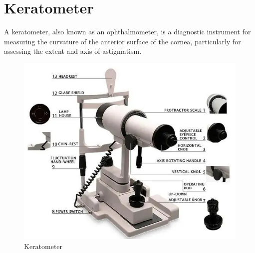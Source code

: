 \documentclass{article}
\begin{document}
\section{Keratometer}
A keratometer, also known as an ophthalmometer, is a diagnostic instrument for measuring the curvature of the anterior surface of the cornea, particularly for assessing the extent and axis of astigmatism.
\begin{figure} [h]
    \centering
    \includegraphics[scale=0.7,center]{ezgif.com-gif-maker (1).jpg}
    \caption{Keratometer}
    \label{fig:keratometer}
\end{figure}
\end{document}
